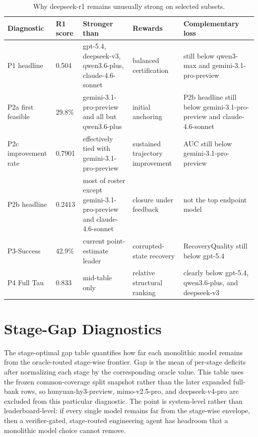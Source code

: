 \begin{table}[t]
\caption{Why deepseek-r1 remains unusually strong on selected subsets.}
\label{tab:appendix_r1_capability}
\centering
\scriptsize
\setlength{\tabcolsep}{3.5pt}
\renewcommand{\arraystretch}{1.08}
\begin{tabular}{lp{18mm}p{22mm}p{31mm}p{31mm}}
\toprule
Diagnostic & R1 score & Stronger than & Rewards & Complementary loss \\
\midrule
P1 headline & 0.504 & gpt-5.4, deepseek-v3, qwen3.6-plus, claude-4.6-sonnet & balanced certification & still below qwen3-max and gemini-3.1-pro-preview \\
P2a first feasible & 29.8\% & gemini-3.1-pro-preview and all but qwen3.6-plus & initial anchoring & P2b headline still below gemini-3.1-pro-preview and claude-4.6-sonnet \\
P2c improvement rate & 0.7901 & effectively tied with gemini-3.1-pro-preview & sustained trajectory improvement & AUC still below gemini-3.1-pro-preview \\
P2b headline & 0.2413 & most of roster except gemini-3.1-pro-preview and claude-4.6-sonnet & closure under feedback & not the top endpoint model \\
P3-Success & 42.9\% & current point-estimate leader & corrupted-state recovery & RecoveryQuality still below gpt-5.4 \\
P4 Full Tau & 0.833 & mid-table only & relative structural ranking & clearly below gpt-5.4, qwen3.6-plus, and deepseek-v3 \\
\bottomrule
\end{tabular}
\end{table}

\section{Stage-Gap Diagnostics}

The stage-optimal gap table quantifies how far each monolithic model remains from the oracle-routed stage-wise frontier. Gap is the mean of per-stage deficits after normalizing each stage by the corresponding oracle value. This table uses the frozen common-coverage split snapshot rather than the later expanded full-bank rows, so hunyuan-hy3-preview, mimo-v2.5-pro, and deepseek-v4-pro are excluded from this particular diagnostic. The point is system-level rather than leaderboard-level: if every single model remains far from the stage-wise envelope, then a verifier-gated, stage-routed engineering agent has headroom that a monolithic model choice cannot remove.

